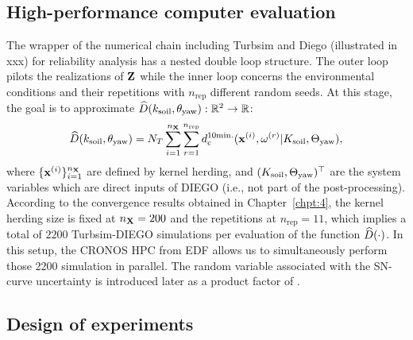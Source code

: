 \subsection{High-performance computer evaluation}
The wrapper of the numerical chain including Turbsim and Diego (illustrated in xxx) for reliability analysis has a nested double loop structure.  
The outer loop pilots the realizations of ${\bf Z}$ while the inner loop concerns the environmental conditions and their repetitions with $n_{\mathrm{rep}}$ different random seeds. 
At this stage, the goal is to approximate $\widehat{D}(k_{\mathrm{soil}}, \theta_{\mathrm{yaw}}):\mathbb{R}^2 \rightarrow \mathbb{R}$: 
\begin{equation}
    \widehat{D}(k_{\mathrm{soil}}, \theta_{\mathrm{yaw}}) = N_T \sum_{i=1}^{n_{\bf X}} \sum_{r=1}^{n_{\mathrm{rep}}} d_{\mathrm{c}}^{10\mathrm{min.}}({\bf x}^{(i)}, \omega^{(r)} | K_{\mathrm{soil}}, \Theta_{\mathrm{yaw}}),
    \label{eq:hpc_cumulated_damage}
\end{equation}
where $\{{\bf x}^{(i)}\}_{i=1}^{n_{\bf X}}$ are defined by kernel herding, and $(K_{\mathrm{soil}}, \Theta_{\mathrm{yaw}})^\top$ are the system variables which are direct inputs of DIEGO (i.e., not part of the post-processing). 
According to the convergence results obtained in Chapter~\ref{chpt:4}, the kernel herding size is fixed at $n_{\bf X}=200$ and the repetitions at $n_{\mathrm{rep}}=11$, which implies a total of $2200$ Turbsim-DIEGO simulations per evaluation of the function $\widehat{D}(\cdot)$. 
In this setup, the CRONOS HPC from EDF allows us to simultaneously perform those 2200 simulation in parallel. 
The random variable associated with the SN-curve uncertainty is introduced later as a product factor of . 

\subsection{Design of experiments}

